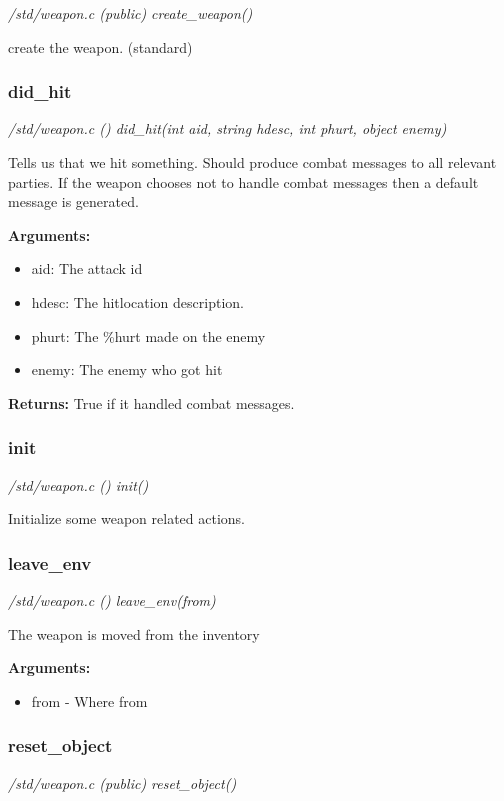 {\em /std/weapon.c (public) create\_weapon()}

create the weapon. (standard)


\subsubsection{did\_hit}

{\em /std/weapon.c () did\_hit(int aid, string hdesc, int phurt, object enemy)}

Tells us that we hit something. Should produce combat
messages to all relevant parties. If the weapon
chooses not to handle combat messages then a default
message is generated.

{\bf Arguments:}
\begin{itemize}
\item      aid:   The attack id
\item hdesc: The hitlocation description.
\item phurt: The \%hurt made on the enemy
\item enemy: The enemy who got hit
\end{itemize}

{\bf Returns:}        True if it handled combat messages.


\subsubsection{init}

{\em /std/weapon.c () init()}

Initialize some weapon related actions.


\subsubsection{leave\_env}

{\em /std/weapon.c () leave\_env(from)}

The weapon is moved from the inventory

{\bf Arguments:}
\begin{itemize}
\item     from - Where from
\end{itemize}


\subsubsection{reset\_object}

{\em /std/weapon.c (public) reset\_object()}

